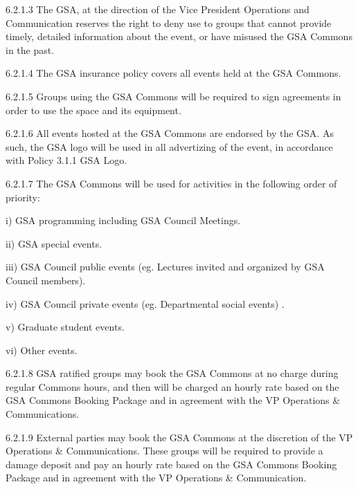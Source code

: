  
 
 6.2.1.3 The GSA, at the direction of the Vice President Operations and Communication reserves the right to deny use to groups that cannot 
 provide timely, detailed information about the event, or have 
 misused the GSA Commons in the past. 
 
 
 
 6.2.1.4 The GSA insurance policy covers all events held at the GSA 
 Commons. 
 
 
 
 6.2.1.5 Groups using the GSA Commons will be required to sign 
 agreements in order to use the space and its equipment. 
 
 
 
 6.2.1.6 All events hosted at the GSA Commons are endorsed by the GSA. 
 As such, the GSA logo will be used in all advertizing of the event, 
 in accordance with Policy 3.1.1 GSA Logo. 
 
 
 
 6.2.1.7 The GSA Commons will be used for activities in the following 
 order of priority: 
 
 
 
 i) GSA programming including GSA Council Meetings. 
 
 
 
 ii) GSA special events. 
 
 
 
 iii) GSA Council public events (eg. Lectures invited and organized by 
 GSA Council members). 
 
 
 
 iv) GSA Council private events (eg. Departmental social events) . 
 
 
 
 v) Graduate student events. 
 
 
 
 vi) Other events. 
 
 6.2.1.8 GSA ratified groups may book the GSA Commons at no charge 
 during regular Commons hours, and then will be charged an hourly 
 rate based on the GSA Commons Booking Package and in 
 agreement with the VP Operations & Communications. 
 
 6.2.1.9 External parties may book the GSA Commons at the discretion of 
 the VP Operations & Communications. These groups will be 
 required to provide a damage deposit and pay an hourly rate based 
 on the GSA Commons Booking Package and in agreement with the 
 VP Operations & Communication. 
 
 
 
